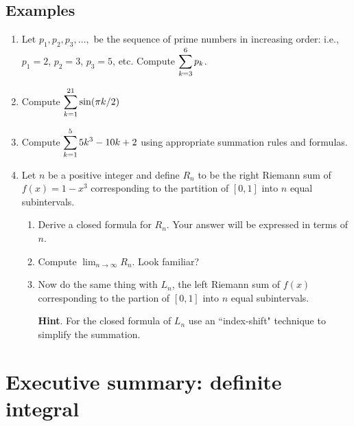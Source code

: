 \subsection*{Examples}
\begin{enumerate}
  \item Let $p_1, p_2,p_3, \dots, $ be the sequence of prime numbers in increasing order: i.e., $p_1=2$, $p_2=3$, $p_3=5$, etc. Compute
  $
  \displaystyle\sum_{k=3}^{6}p_k
  $.
  \item Compute
  $
  \displaystyle \sum_{k=1}^{21}\sin(\pi k/2)
  $
  \item Compute $\displaystyle \sum_{k=1}^{5} 5k^3-10k+2$ using appropriate summation rules and formulas.
  \item Let $n$ be a positive integer and define $R_n$ to be the right Riemann sum of $f(x)=1-x^3$ corresponding to the partition of $[0,1]$ into $n$ equal subintervals.
  \begin{enumerate}
    \item Derive a closed formula for $R_n$. Your answer will be expressed in terms of $n$.
    \item Compute $\lim_{n\to \infty}R_n$. Look familiar?
    \item Now do the same thing with $L_n$, the left Riemann sum of $f(x)$ corresponding to the partion of $[0,1]$ into $n$ equal subintervals.

    {\bf Hint}. For the closed formula of $L_n$ use an ``index-shift" technique to simplify the summation.
  \end{enumerate}
\end{enumerate}



\newpage

\section{Executive summary: definite integral}

\thispagestyle{fancy}
